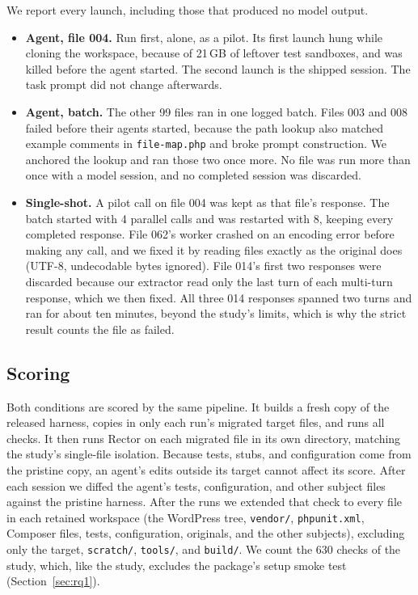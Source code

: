 \documentclass[11pt]{article}
\newcommand{\code}[1]{\texttt{#1}}
\begin{document}
We report every launch, including those that produced no model output.
\begin{itemize}
  \item \textbf{Agent, file 004.} Run first, alone, as a pilot. Its first launch hung while cloning the workspace, because of 21\,GB of leftover test sandboxes, and was killed before the agent started. The second launch is the shipped session. The task prompt did not change afterwards.
  \item \textbf{Agent, batch.} The other 99 files ran in one logged batch. Files 003 and 008 failed before their agents started, because the path lookup also matched example comments in \code{file-map.php} and broke prompt construction. We anchored the lookup and ran those two once more. No file was run more than once with a model session, and no completed session was discarded.
  \item \textbf{Single-shot.} A pilot call on file 004 was kept as that file's response. The batch started with 4 parallel calls and was restarted with 8, keeping every completed response. File 062's worker crashed on an encoding error before making any call, and we fixed it by reading files exactly as the original does (UTF-8, undecodable bytes ignored). File 014's first two responses were discarded because our extractor read only the last turn of each multi-turn response, which we then fixed. All three 014 responses spanned two turns and ran for about ten minutes, beyond the study's limits, which is why the strict result counts the file as failed.
\end{itemize}

\subsection{Scoring}

Both conditions are scored by the same pipeline.
It builds a fresh copy of the released harness, copies in only each run's migrated target files, and runs all checks.
It then runs Rector on each migrated file in its own directory, matching the study's single-file isolation.
Because tests, stubs, and configuration come from the pristine copy, an agent's edits outside its target cannot affect its score.
After each session we diffed the agent's tests, configuration, and other subject files against the pristine harness.
After the runs we extended that check to every file in each retained workspace (the WordPress tree, \code{vendor/}, \code{phpunit.xml}, Composer files, tests, configuration, originals, and the other subjects), excluding only the target, \code{scratch/}, \code{tools/}, and \code{build/}.
We count the 630 checks of the study, which, like the study, excludes the package's setup smoke test (Section~\ref{sec:rq1}).
\end{document}
